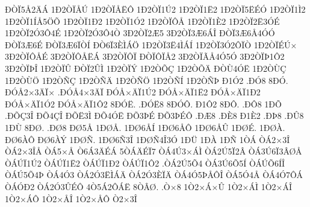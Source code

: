 {^^d0^^d2^^cf5^^c52^^c4^^c1
1^^d02^^d2^^cf^^c5^^da
1^^d02^^d2^^cf^^c5^^cb^^d4
1^^d02^^d2^^cf1^^da2
1^^d02^^d2^^cf1^^cb2
1^^d02^^d2^^cf5^^cb^^c9^^d3
1^^d02^^d2^^cf1^^cc2
1^^d02^^d2^^cf1^^cd^^c55^^d6^^d5
1^^d02^^d2^^cf1^^d02
1^^d02^^d2^^cf1^^d32
1^^d02^^d2^^cf^^d4^^c5
1^^d02^^d2^^cf1^^c82
1^^d02^^d2^^cf2^^cb3^^d3^^c9
1^^d02^^d2^^cf2^^d33^^d44^^c9
1^^d02^^d2^^cf2^^d33^^d44^^d2
3^^d02^^d2^^cf2^^c65
3^^d02^^d2^^cf3^^c66^^c1^^ce
^^d0^^d2^^cf3^^c66^^c54^^d3^^d3
^^d0^^d2^^cf3^^c66^^c9
^^d0^^d2^^cf3^^c66^^cf^^d2^^cd
^^d0^^d26^^cf3^^c8^^cc^^c1^^d6
1^^d02^^d2^^cf3^^cb4^^cc^^c1^^cd
1^^d02^^d2^^cf3^^d32^^d4^^cf^^d2
1^^d02^^d2^^cf^^c9^^da^^d7
3^^d02^^d2^^cf^^d4^^c5^^c9
3^^d02^^d2^^cf^^d4^^c5^^cb^^c1
3^^d02^^d2^^cf^^d4^^cf
^^d0^^d2^^cf^^d4^^cf^^c52
3^^d02^^d2^^cf^^c3^^c54^^d35^^d3
3^^d02^^d2^^cf^^de1^^d42
3^^d02^^d2^^cf^^de^^ce
1^^d02^^d2^^cf^^db
^^d0^^d2^^cf2^^db^^cc
1^^d02^^d2^^cf^^dd
1^^d02^^d2^^d5^^c7
1^^d02^^d2^^d5^^c4
^^d0^^d2^^d94^^d3^^cb
1^^d02^^d2^^d9^^c7
1^^d02^^d2^^d9^^d6
1^^d02^^d2^^d1^^c7
1^^d02^^d2^^d1^^c4
1^^d02^^d2^^d1^^d6
1^^d02^^d2^^d1^^cd
1^^d02^^d2^^d1^^de
^^d01^^d32
.^^d0^^d38
8^^d0^^d3.
^^d0^^d3^^c52^^d73^^c4^^cf^^d7
.^^d0^^d3^^c54^^d73^^c4^^cf
^^d0^^d3^^c5^^d7^^c4^^cf1^^da2
^^d0^^d3^^c5^^d7^^c4^^cf1^^cb2
^^d0^^d3^^c5^^d7^^c4^^cf1^^d02
^^d0^^d3^^c5^^d7^^c4^^cf1^^d32
^^d0^^d3^^c5^^d7^^c4^^cf1^^d42
8^^d0^^d3^^cb.
.^^d0^^d3^^cb8
8^^d0^^d3^^d4.
^^d01^^d42
8^^d0^^d4.
.^^d0^^d48
1^^d0^^d5
.^^d0^^d5^^c73^^ce
^^d0^^d54^^c7^^ce
^^d0^^d5^^cb3^^cc
^^d0^^d54^^d3^^cb
^^d0^^d53^^de^^c9
^^d0^^d53^^de^^c9^^d4
.^^d0^^c68
.^^d0^^c88
^^d01^^c82
.^^d0^^de8
.^^d0^^db8
1^^d0^^d9
8^^d0^^d8.
.^^d0^^d88
^^d0^^d85^^c5
1^^d0^^d8^^c5.
1^^d0^^d86^^c5^^cd
1^^d0^^d86^^c5^^d4
1^^d0^^d86^^c5^^db
1^^d0^^d8^^c9.
1^^d0^^d8^^c0.
^^d0^^d86^^c0^^d4
^^d0^^d86^^c0^^dd
1^^d0^^d8^^d1.
1^^d0^^d86^^d13^^ce
1^^d0^^d8^^d14^^ce3^^d3
1^^d0^^dc
1^^d0^^c0
1^^d0^^d1
1^^d2^^c1
^^d2^^c12^^d73^^ce
^^d2^^c12^^d73^^ce^^c5
^^d2^^c15^^d7^^c5
^^d26^^c13^^c4^^c9^^c1
5^^d2^^c1^^c4^^c9^^cf7
^^d2^^c14^^da3^^d7^^c1^^cc
^^d2^^c12^^da5^^cf2^^c2
^^d2^^c13^^da6^^cf3^^c2^^d8^^c5
^^d2^^c1^^da^^cf1^^da2
^^d2^^c1^^da^^cf1^^cb2
^^d2^^c1^^da^^cf1^^d02
^^d2^^c1^^da^^cf1^^d42
.^^d2^^c12^^da5^^d54
^^d2^^c13^^da6^^d55^^cd
^^d2^^c1^^da^^d56^^cd^^ce
^^d2^^c1^^da5^^d54^^de
^^d2^^c14^^d33
^^d2^^c12^^d33^^cb^^cc^^c1^^c4
^^d2^^c12^^d33^^c8^^cf^^c4
^^d2^^c14^^d35^^de^^c5^^d4^^ce
^^d2^^c15^^d34^^c5
^^d2^^c14^^d37^^d4^^c1
^^d2^^c1^^d3^^d02
^^d2^^c12^^d33^^db^^c9^^d4
4^^d25^^c12^^d4^^c1^^cb
8^^d2^^c2^^d8.
.^^d2^^d78
1^^d22^^d7^^c1^^d7^^db
1^^d22^^d7^^c1^^cc
1^^d22^^d7^^c1^^ce
1^^d22^^d7^^c1^^d4
1^^d22^^d7^^c5^^ce
1^^d22^^d7^^c5^^d4
^^d22^^d73^^ce
}
